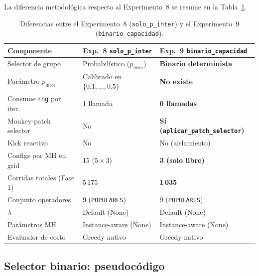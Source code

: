 La diferencia metodológica respecto al Experimento~8 se resume en la
Tabla~\ref{tab:comparativa-approaches-binario-capacidad}.

\begin{table}[h]
\centering
\caption{Diferencias entre el Experimento~8 (\texttt{solo\_p\_inter})
         y el Experimento~9 (\texttt{binario\_capacidad}).}
\label{tab:comparativa-approaches-binario-capacidad}
\small
\begin{tabular}{lll}
\toprule
Componente & Exp.~8 \texttt{solo\_p\_inter} & Exp.~9 \texttt{binario\_capacidad} \\
\midrule
Selector de grupo        & Probabilístico ($p_{\text{inter}}$)   & \textbf{Binario determinista} \\
Parámetro $p_{\text{inter}}$ & Calibrado en $\{0.1,\ldots,0.5\}$ & \textbf{No existe} \\
Consume \texttt{rng} por iter. & 1 llamada                        & \textbf{0 llamadas} \\
Monkey-patch selector    & No                                    & \textbf{Sí (\texttt{aplicar\_patch\_selector})} \\
Kick reactivo            & No                                    & No (aislamiento) \\
Configs por MH en grid   & 15 ($5 \times 3$)                     & \textbf{3 (solo libre)} \\
Corridas totales (Fase 1)& 5\,175                                & \textbf{1\,035} \\
Conjunto operadores      & 9 (\texttt{POPULARES})                & 9 (\texttt{POPULARES}) \\
$\lambda$                & Default (None)                        & Default (None) \\
Parámetros MH            & Instance-aware (None)                 & Instance-aware (None) \\
Evaluador de costo       & Greedy nativo                         & Greedy nativo \\
\bottomrule
\end{tabular}
\end{table}

\subsection{Selector binario: pseudocódigo}
\label{subsec:selector-binario-capacidad}

